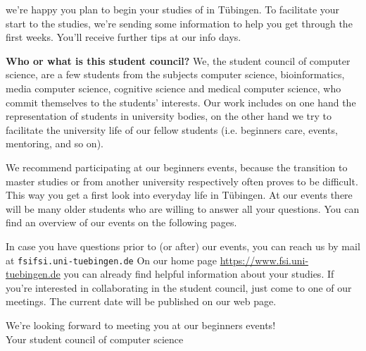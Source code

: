 we're happy you plan to begin your studies of \studiengang in Tübingen.
To facilitate your start to the studies, we're sending some information to help you get through the first weeks.
You'll receive further tips at our info days.

\textbf{Who or what is this \glqq student council\grqq?} We, the student council of computer science, are a few students from the subjects computer science, bioinformatics, media computer science, cognitive science and medical computer science, who commit themselves to the students' interests. Our work includes on one hand the representation of students in university bodies, on the other hand we try to facilitate the university life of our fellow students (i.e. beginners care,
events, mentoring, and so on).

\ifmaster
    \ifml
We recommend participating at our beginners events, because the transition to master studies or from another university respectively often proves to be difficult. This way you get a first look into everyday life in Tübingen.
    \fi
\fi 
At our events there will be many older students who are willing to answer all your questions. You can find an overview of our events on the following pages.

In case you have questions prior to (or after) our events, you can reach us by mail at \texttt{fsi\At fsi.uni-tuebingen.de}
On our home page
\url{https://www.fsi.uni-tuebingen.de} you can already find helpful information about your studies. If you're interested in collaborating in the student council, just come to one of our meetings. The current date will be published on our web page.

We're looking forward to meeting you at our beginners events!\\
Your student council of computer science
\vfill
